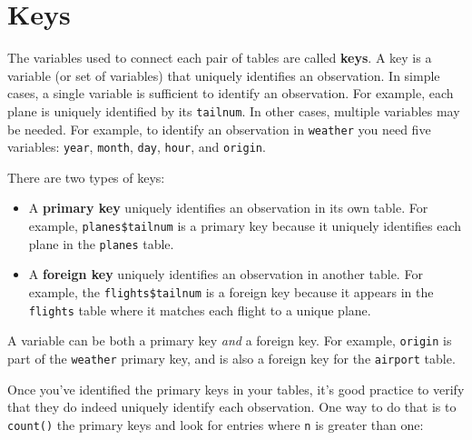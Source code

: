 \documentclass[]{book}
\newenvironment{Shaded}{\begin{snugshade}}{\end{snugshade}}
\newcommand{\KeywordTok}[1]{\textcolor[rgb]{0.13,0.29,0.53}{\textbf{{#1}}}}
\newcommand{\DecValTok}[1]{\textcolor[rgb]{0.00,0.00,0.81}{{#1}}}
\newcommand{\StringTok}[1]{\textcolor[rgb]{0.31,0.60,0.02}{{#1}}}
\newcommand{\CommentTok}[1]{\textcolor[rgb]{0.56,0.35,0.01}{\textit{{#1}}}}
\newcommand{\NormalTok}[1]{{#1}}
\begin{document}
\section{Keys}\label{keys}

The variables used to connect each pair of tables are called
\textbf{keys}. A key is a variable (or set of variables) that uniquely
identifies an observation. In simple cases, a single variable is
sufficient to identify an observation. For example, each plane is
uniquely identified by its \texttt{tailnum}. In other cases, multiple
variables may be needed. For example, to identify an observation in
\texttt{weather} you need five variables: \texttt{year}, \texttt{month},
\texttt{day}, \texttt{hour}, and \texttt{origin}.

There are two types of keys:

\begin{itemize}
\item
  A \textbf{primary key} uniquely identifies an observation in its own
  table. For example, \texttt{planes\$tailnum} is a primary key because
  it uniquely identifies each plane in the \texttt{planes} table.
\item
  A \textbf{foreign key} uniquely identifies an observation in another
  table. For example, the \texttt{flights\$tailnum} is a foreign key
  because it appears in the \texttt{flights} table where it matches each
  flight to a unique plane.
\end{itemize}

A variable can be both a primary key \emph{and} a foreign key. For
example, \texttt{origin} is part of the \texttt{weather} primary key,
and is also a foreign key for the \texttt{airport} table.

Once you've identified the primary keys in your tables, it's good
practice to verify that they do indeed uniquely identify each
observation. One way to do that is to \texttt{count()} the primary keys
and look for entries where \texttt{n} is greater than one:

\begin{Shaded}
\end{Shaded}
\end{document}
